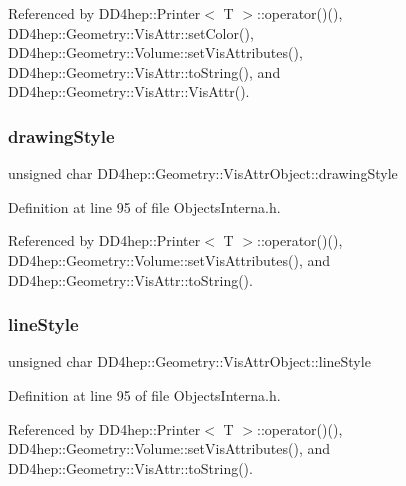 Referenced by D\+D4hep\+::\+Printer$<$ T $>$\+::operator()(), D\+D4hep\+::\+Geometry\+::\+Vis\+Attr\+::set\+Color(), D\+D4hep\+::\+Geometry\+::\+Volume\+::set\+Vis\+Attributes(), D\+D4hep\+::\+Geometry\+::\+Vis\+Attr\+::to\+String(), and D\+D4hep\+::\+Geometry\+::\+Vis\+Attr\+::\+Vis\+Attr().

\hypertarget{class_d_d4hep_1_1_geometry_1_1_vis_attr_object_ac6a253b99e112880c1ef727f9b9f9e73}{}\label{class_d_d4hep_1_1_geometry_1_1_vis_attr_object_ac6a253b99e112880c1ef727f9b9f9e73} 
\subsubsection{\texorpdfstring{drawing\+Style}{drawingStyle}}
{\footnotesize\ttfamily unsigned char D\+D4hep\+::\+Geometry\+::\+Vis\+Attr\+Object\+::drawing\+Style}



Definition at line 95 of file Objects\+Interna.\+h.



Referenced by D\+D4hep\+::\+Printer$<$ T $>$\+::operator()(), D\+D4hep\+::\+Geometry\+::\+Volume\+::set\+Vis\+Attributes(), and D\+D4hep\+::\+Geometry\+::\+Vis\+Attr\+::to\+String().

\hypertarget{class_d_d4hep_1_1_geometry_1_1_vis_attr_object_aaede923ed352bb5f43a809f6943f2061}{}\label{class_d_d4hep_1_1_geometry_1_1_vis_attr_object_aaede923ed352bb5f43a809f6943f2061} 
\subsubsection{\texorpdfstring{line\+Style}{lineStyle}}
{\footnotesize\ttfamily unsigned char D\+D4hep\+::\+Geometry\+::\+Vis\+Attr\+Object\+::line\+Style}



Definition at line 95 of file Objects\+Interna.\+h.



Referenced by D\+D4hep\+::\+Printer$<$ T $>$\+::operator()(), D\+D4hep\+::\+Geometry\+::\+Volume\+::set\+Vis\+Attributes(), and D\+D4hep\+::\+Geometry\+::\+Vis\+Attr\+::to\+String().


